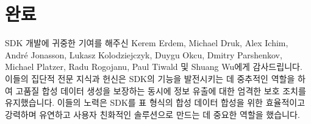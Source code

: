 \documentclass[journal]{IEEEtran}
\begin{document}





%


\section*{완료}


SDK 개발에 귀중한 기여를 해주신 Kerem Erdem, Michael Druk, Alex Ichim, André Jonasson, Lukasz Kolodziejczyk, Duygu Okcu, Dmitry Parshenkov, Michael Platzer, Radu Rogojanu, Paul Tiwald 및 Shuang Wu에게 감사드립니다. 이들의 집단적 전문 지식과 헌신은 SDK의 기능을 발전시키는 데 중추적인 역할을 하여 고품질 합성 데이터 생성을 보장하는 동시에 정보 유출에 대한 엄격한 보호 조치를 유지했습니다. 이들의 노력은 SDK를 표 형식의 합성 데이터 합성을 위한 효율적이고 강력하며 유연하고 사용자 친화적인 솔루션으로 만드는 데 중요한 역할을 했습니다.
\end{document}
